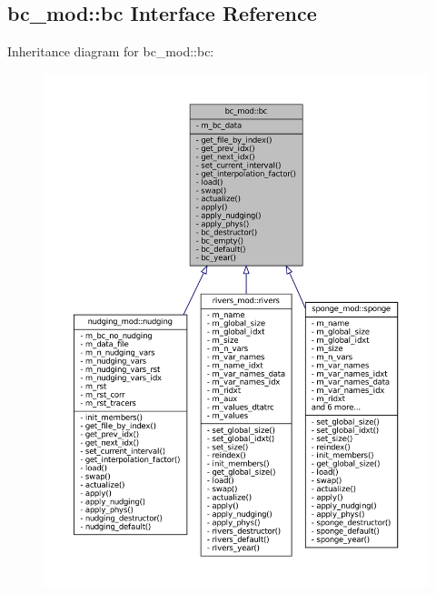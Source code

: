 \hypertarget{structbc__mod_1_1bc}{}\subsection{bc\+\_\+mod\+:\+:bc Interface Reference}
\label{structbc__mod_1_1bc}


Inheritance diagram for bc\+\_\+mod\+:\+:bc\+:
\nopagebreak
\begin{figure}[H]
\begin{center}
\leavevmode
\includegraphics[width=350pt]{structbc__mod_1_1bc__inherit__graph}
\end{center}
\end{figure}

